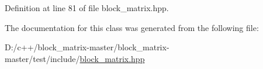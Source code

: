 Definition at line 81 of file block\+\_\+matrix.\+hpp.



The documentation for this class was generated from the following file\+:\begin{DoxyCompactItemize}
\item 
D\+:/c++/block\+\_\+matrix-\/master/block\+\_\+matrix-\/master/test/include/\mbox{\hyperlink{test_2include_2block__matrix_8hpp}{block\+\_\+matrix.\+hpp}}\end{DoxyCompactItemize}
